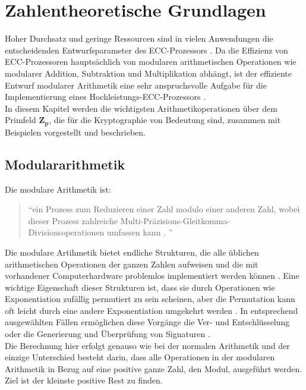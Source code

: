\chapter{Zahlentheoretische Grundlagen}

Hoher Durchsatz und geringe Ressourcen sind in vielen Anwendungen die entscheidenden Entwurfsparameter des ECC-Prozessors \cite{Hossain2019}.
Da die Effizienz von ECC-Prozessoren hauptsächlich von modularen
arithmetischen Operationen wie modularer Addition, Subtraktion und Multiplikation abhängt, ist der effiziente Entwurf modularer
Arithmetik eine sehr anspruchsvolle Aufgabe für die
Implementierung eines Hochleistungs-ECC-Prozessors \cite{Hossain2019}.\\ 

In diesem Kapitel werden die wichtigsten Arithmetikoperationen  über dem Primfeld $ \mathbf{ Z_p } $, die für die Kryptographie von Bedeutung sind, zusammen mit Beispielen vorgestellt und beschrieben. 

\section{Modulararithmetik}

Die modulare Arithmetik ist:
\begin{quote} \enquote{ein Prozess zum Reduzieren einer Zahl modulo einer
anderen Zahl, wobei dieser Prozess zahlreiche
Multi-Präzisions-Gleitkomma-Divisionsoperationen
umfassen kann \cite{patent}.
}\end{quote} 
Die modulare Artihmetik bietet endliche Strukturen, die alle üblichen arithmetischen Operationen der ganzen Zahlen aufweisen und die mit vorhandener Computerhardware problemlos implementiert werden können \cite{Contini2011}.
Eine wichtige Eigenschaft dieser Strukturen ist, dass sie durch Operationen wie Exponentiation zufällig permutiert zu sein scheinen, aber die Permutation kann oft leicht durch eine andere Exponentiation umgekehrt werden \cite{Contini2011}.
In entsprechend ausgewählten Fällen ermöglichen diese Vorgänge die Ver- und
Entschlüsselung oder die Generierung und Überprüfung von Signaturen
\cite{Contini2011}.\\

Die Berechnung hier erfolgt genauso wie bei der normalen Arithmetik
und der einzige Unterschied besteht darin, dass  alle
Operationen in der modularen Arithmetik in Bezug auf eine
positive ganze Zahl, den Modul, ausgeführt werden.
Ziel ist der kleinste positive Rest zu finden. \\

